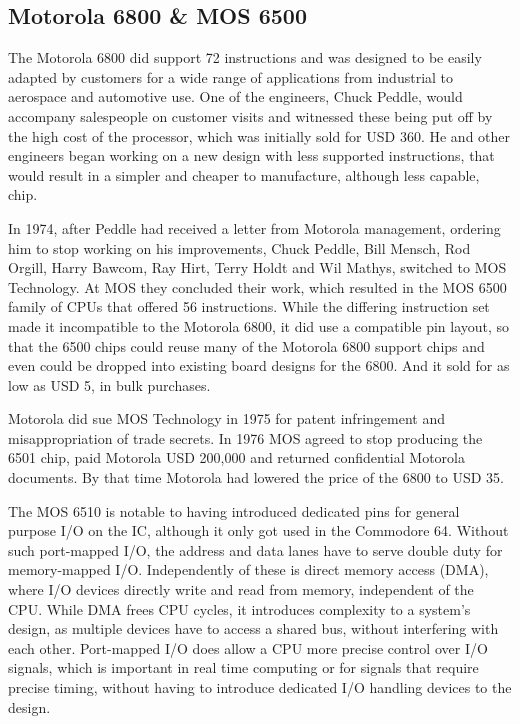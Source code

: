 \documentclass[twoside,twocolumn]{article}
\begin{document}
\subsection{Motorola 6800 \& MOS 6500}

The Motorola 6800 did support 72 instructions and was designed to be easily adapted by
customers for a wide range of applications from industrial to aerospace and automotive
use. One of the engineers, Chuck Peddle, would accompany salespeople on customer visits
and witnessed these being put off by the high cost of the processor, which was initially
sold for USD 360. He and other engineers began working on a new design with less
supported instructions, that would result in a simpler and cheaper to manufacture,
although less capable, chip.

In 1974, after Peddle had received a letter from Motorola management, ordering him to
stop working on his improvements, Chuck Peddle, Bill Mensch, Rod Orgill, Harry Bawcom,
Ray Hirt, Terry Holdt and Wil Mathys, switched to MOS Technology. At MOS they concluded
their work, which resulted in the MOS 6500 family of CPUs that offered 56 instructions.
While the differing instruction set made it incompatible to the Motorola 6800, it did
use a compatible pin layout, so that the 6500 chips could reuse many of the Motorola 6800
support chips and even could be dropped into existing board designs for the 6800. And it
sold for as low as USD 5, in bulk purchases.

Motorola did sue MOS Technology in 1975 for patent infringement and misappropriation of
trade secrets. In 1976 MOS agreed to stop producing the 6501 chip, paid Motorola USD
200,000 and returned confidential Motorola documents. By that time Motorola had lowered
the price of the 6800 to USD 35.

The MOS 6510 is notable to having introduced dedicated pins for general purpose I/O on
the IC, although it only got used in the Commodore 64. Without such port-mapped I/O, the
address and data lanes have to serve double duty for memory-mapped I/O. Independently of
these is direct memory access (DMA), where I/O devices directly write and read from
memory, independent of the CPU. While DMA frees CPU cycles, it introduces complexity to a
system's design, as multiple devices have to access a shared bus, without interfering
with each other. Port-mapped I/O does allow a CPU more precise control over I/O signals,
which is important in real time computing or for signals that require precise timing,
without having to introduce dedicated I/O handling devices to the design.
\end{document}
